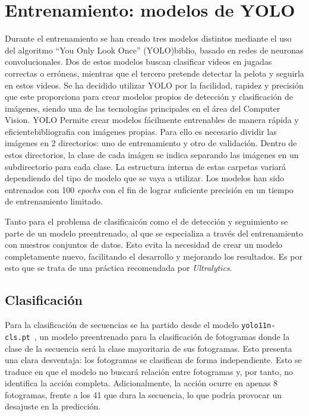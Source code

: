 \documentclass[12pt]{report} %
\begin{document}
    \section{Entrenamiento: modelos de YOLO}

    Durante el entrenamiento se han creado tres modelos distintos mediante el
    uso del algoritmo ``You Only Look Once'' (YOLO){biblio}, basado en redes de
    neuronas convolucionales. Dos de estos modelos buscan clasificar videos en
    jugadas correctas o erróneas, mientras que el tercero pretende detectar la
    pelota y seguirla en estos videos. Se ha decidido utilizar YOLO por la
    facilidad, rapidez y precisión que este proporciona para crear modelos
    propios de detección y clasificación de imágenes, siendo una de las
    tecnologías principales en el área del Computer Vision. YOLO Permite crear
    modelos fácilmente entrenables de manera rápida y eficiente{bibliografia}
    con imágenes propias. Para ello es necesario dividir las imágenes en 2
    directorios: uno de entrenamiento y otro de validación. Dentro de estos
    directorios, la clase de cada imágen se indica separando las imágenes en un
    subdirectorio para cada clase. La estructura interna de estas carpetas
    variará dependiendo del tipo de modelo que se vaya a utilizar. Los modelos
    han sido entrenados con 100 \textit{epochs} con el fin de lograr suficiente
    precisión en un tiempo de entrenamiento limitado.

    Tanto para el problema de clasificaicón como el de detección y seguimiento
    se parte de un modelo preentrenado, al que se especializa a través del
    entrenamiento con nuestros conjuntos de datos. Esto evita la necesidad de
    crear un modelo completamente nuevo, facilitando el desarrollo y mejorando
    los resultados. Es por esto que se trata de una práctica recomendada por
    \textit{Ultralytics}.

    \subsection{Clasificación}
    Para la clasificación de secuencias se ha partido desde el modelo
    \texttt{yolo11n-cls.pt}~\cite{yolo11n-csl}, un modelo preentrenado para la
    clasificación de fotogramas donde la clase de la secuencia será la clase
    mayoritaria de sus fotogramas. Esto presenta una clara desventaja: los
    fotogramas se clasifican de forma independiente. Esto se traduce en que el
    modelo no buscará relación entre fotogramas y, por tanto, no identifica la
    acción completa. Adicionalmente, la acción ocurre en apenas 8 fotogramas,
    frente a los 41 que dura la secuencia, lo que podría provocar un desajuste
    en la predicción.
    
\end{document}
